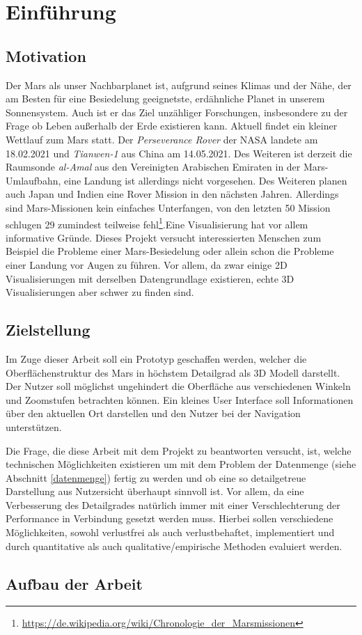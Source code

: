 \chapter{Einführung}

\section{Motivation}
Der Mars als unser Nachbarplanet ist, aufgrund seines Klimas und der Nähe, der am Besten für eine Besiedelung geeignetste, erdähnliche Planet in unserem Sonnensystem. Auch ist er das Ziel unzähliger Forschungen, insbesondere zu der Frage ob Leben außerhalb der Erde existieren kann. Aktuell findet ein kleiner Wettlauf zum Mars statt. Der \textit{Perseverance Rover} der NASA landete am 18.02.2021 und \textit{Tianwen-1} aus China am 14.05.2021. Des Weiteren ist derzeit die Raumsonde \textit{al-Amal} aus den Vereinigten Arabischen Emiraten in der Mars-Umlaufbahn, eine Landung ist allerdings nicht vorgesehen. Des Weiteren planen auch Japan und Indien eine Rover Mission in den nächsten Jahren. Allerdings sind Mars-Missionen kein einfaches Unterfangen, von den letzten 50 Mission schlugen 29 zumindest teilweise fehl\footnote{\url{https://de.wikipedia.org/wiki/Chronologie_der_Marsmissionen}}.Eine Visualisierung hat vor allem informative Gründe. Dieses Projekt versucht interessierten Menschen zum Beispiel die Probleme einer Mars-Besiedelung oder allein schon die Probleme einer Landung vor Augen zu führen. Vor allem, da zwar einige 2D Visualisierungen mit derselben Datengrundlage existieren, echte 3D Visualisierungen aber schwer zu finden sind.

\section{Zielstellung}
Im Zuge dieser Arbeit soll ein Prototyp geschaffen werden, welcher die Oberflächenstruktur des Mars in höchstem Detailgrad als 3D Modell darstellt. Der Nutzer soll möglichst ungehindert die Oberfläche aus verschiedenen Winkeln und Zoomstufen betrachten können. Ein kleines User Interface soll Informationen über den aktuellen Ort darstellen und den Nutzer bei der Navigation unterstützen.

Die Frage, die diese Arbeit mit dem Projekt zu beantworten versucht, ist, welche technischen Möglichkeiten existieren um mit dem Problem der Datenmenge (siehe Abschnitt \ref{datenmenge}) fertig zu werden und ob eine so detailgetreue Darstellung aus Nutzersicht überhaupt sinnvoll ist. Vor allem, da eine Verbesserung des Detailgrades natürlich immer mit einer Verschlechterung der Performance in Verbindung gesetzt werden muss. Hierbei sollen verschiedene Möglichkeiten, sowohl verlustfrei als auch verlustbehaftet, implementiert und durch quantitative als auch qualitative/empirische Methoden evaluiert werden.

\section{Aufbau der Arbeit}

